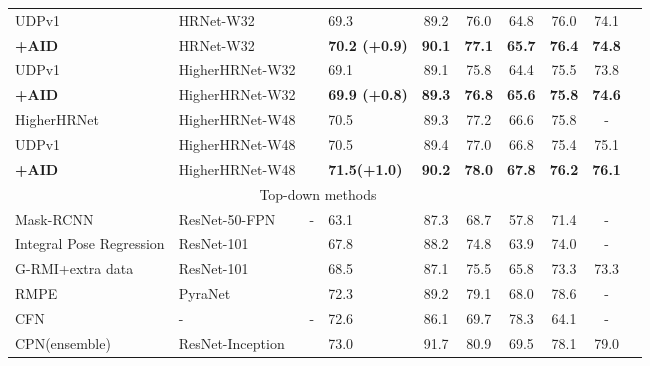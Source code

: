 \documentclass[final]{cvpr}
\begin{document}
\begin{table*}
\begin{center}
\begin{tabular}{l|l|c|lcccccc}
UDPv1 \cite{UDP}                   & HRNet-W32     &    &69.3                  & 89.2              & 76.0         & 64.8          &76.0           &74.1\\
\textbf{+AID}                     & HRNet-W32     &    &\textbf{70.2 (+0.9)}   &\textbf{90.1}      &\textbf{77.1} &\textbf{65.7}  &\textbf{76.4}  &\textbf{74.8}\\
UDPv1 \cite{UDP}                   &HigherHRNet-W32&    &69.1                  & 89.1              & 75.8         & 64.4          &75.5           &73.8\\
\textbf{+AID}                     &HigherHRNet-W32&    &\textbf{69.9 (+0.8)}   &\textbf{89.3}      &\textbf{76.8} &\textbf{65.6}  &\textbf{75.8}  &\textbf{74.6}\\
HigherHRNet \cite{Higher}          &HigherHRNet-W48&    &70.5                  & 89.3              & 77.2         & 66.6          &75.8           &-\\
UDPv1\cite{UDP}                   &HigherHRNet-W48&    &70.5                  & 89.4              & 77.0         & 66.8          &75.4           &75.1\\
\textbf{+AID}                     &HigherHRNet-W48&    &\textbf{71.5(+1.0)}   &\textbf{90.2}      &\textbf{78.0} &\textbf{67.8}  &\textbf{76.2}  &\textbf{76.1}\\
\hline
\multicolumn{9}{c}{Top-down methods}\\
\hline
Mask-RCNN \cite{Mask-RCNN}        & ResNet-50-FPN  &-                &63.1                  & 87.3             & 68.7          & 57.8          &71.4           &-   \\
Integral Pose Regression \cite{IPR}& ResNet-101    &  &67.8                  & 88.2             & 74.8          & 63.9          &74.0           &-   \\
G-RMI+extra data \cite{G-RMI}     & ResNet-101       &&68.5                  & 87.1             & 75.5          & 65.8          &73.3           &73.3\\
RMPE \cite{RMPE}             & PyraNet\cite{PyraNet}& &72.3                  & 89.2             & 79.1          & 68.0          &78.6           &-   \\
CFN \cite{CFN}                    & -                &-              &72.6                  & 86.1             & 69.7          & 78.3          &64.1           &-   \\
CPN(ensemble) \cite{CPN}          & ResNet-Inception &&73.0                  & 91.7             & 80.9          & 69.5          &78.1           &79.0\\

\end{tabular}
\end{center}
\end{table*}
\end{document}
